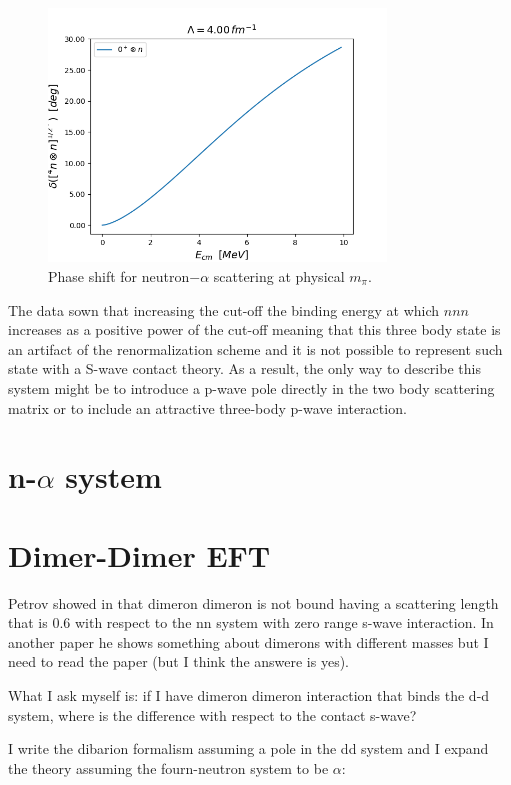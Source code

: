 \documentclass{article}
\begin{document}
\begin{figure}[h] 
\centering 
\includegraphics[width=0.8\textwidth]{./Figure_4.png} 
\caption{Phase shift for neutron$-\alpha$ scattering at physical $m_\pi$.} 
\end{figure}

The data sown that increasing the cut-off the binding energy at which $nnn$ increases as a positive power of the cut-off meaning that this three body state is an artifact of the renormalization scheme and it is not possible to represent such state with a S-wave contact theory. 
As a result, the only way to describe this system might be to introduce a p-wave pole directly in the two body scattering matrix or to include an attractive three-body p-wave interaction.


\section{n-$\alpha$ system}

\section{Dimer-Dimer EFT}

Petrov showed in \cite{petrov_dimerov} that dimeron dimeron is not bound having a scattering length that is 0.6 with respect to the nn system with zero range s-wave interaction.
In another paper \cite{petrov_dimerov_nm} he shows something about dimerons with different masses but I need to read the paper (but I think the answere is yes). 

What I ask myself is: if I have dimeron dimeron interaction that binds the d-d system, where is the difference with respect to the contact s-wave?

I write the dibarion formalism assuming a pole in the dd system and I expand the theory assuming the fourn-neutron system to be $\alpha$:
\end{document}
